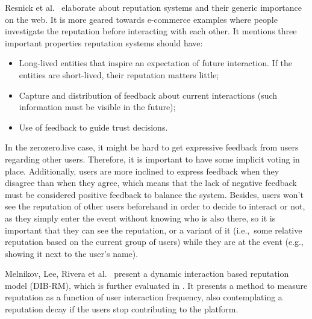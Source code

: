 Resnick et al.\ \cite{Resnick2000} elaborate about reputation systems and their generic importance on the web. It is more geared towards e-commerce examples where people investigate the reputation before interacting with each other. It mentions three important properties reputation systems should have:
\begin{itemize}
    \item Long-lived entities that inspire an expectation of future interaction. If the entities are short-lived, their reputation matters little;
    \item Capture and distribution of feedback about current interactions (such information must be visible in the future);
    \item Use of feedback to guide trust decisions.
\end{itemize}
In the zerozero.live case, it might be hard to get expressive feedback from users regarding other users. Therefore, it is important to have some implicit voting in place. Additionally, users are more inclined to express feedback when they disagree than when they agree, which means that the lack of negative feedback must be considered positive feedback to balance the system. Besides, users won't see the reputation of other users beforehand in order to decide to interact or not, as they simply enter the event without knowing who is also there, so it is important that they can see the reputation, or a variant of it (i.e.,\ some relative reputation based on the current group of users) while they are at the event (e.g., showing it next to the user's name).

Melnikov, Lee, Rivera et al.\ \cite{Melnikov2018} present a dynamic interaction based reputation model (DIB-RM), which is further evaluated in \cite{Yashkina2020}. It presents a method to measure reputation as a function of user interaction frequency, also contemplating a reputation decay if the users stop contributing to the platform. 

